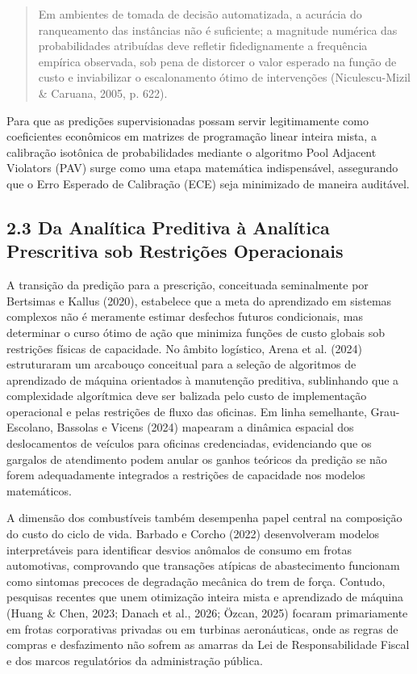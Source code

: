 \documentclass[10pt,a4paper,journal]{article}
\begin{document}
\begin{quote}
\small Em ambientes de tomada de decisão automatizada, a acurácia do ranqueamento das instâncias não é suficiente; a magnitude numérica das probabilidades atribuídas deve refletir fidedignamente a frequência empírica observada, sob pena de distorcer o valor esperado na função de custo e inviabilizar o escalonamento ótimo de intervenções (Niculescu-Mizil \& Caruana, 2005, p. 622).
\end{quote}
Para que as predições supervisionadas possam servir legitimamente como coeficientes econômicos em matrizes de programação linear inteira mista, a calibração isotônica de probabilidades mediante o algoritmo Pool Adjacent Violators (PAV) surge como uma etapa matemática indispensável, assegurando que o Erro Esperado de Calibração (ECE) seja minimizado de maneira auditável.

\subsection{2.3 Da Analítica Preditiva à Analítica Prescritiva sob Restrições Operacionais}
A transição da predição para a prescrição, conceituada seminalmente por Bertsimas e Kallus (2020), estabelece que a meta do aprendizado em sistemas complexos não é meramente estimar desfechos futuros condicionais, mas determinar o curso ótimo de ação que minimiza funções de custo globais sob restrições físicas de capacidade. No âmbito logístico, Arena et al. (2024) estruturaram um arcabouço conceitual para a seleção de algoritmos de aprendizado de máquina orientados à manutenção preditiva, sublinhando que a complexidade algorítmica deve ser balizada pelo custo de implementação operacional e pelas restrições de fluxo das oficinas. Em linha semelhante, Grau-Escolano, Bassolas e Vicens (2024) mapearam a dinâmica espacial dos deslocamentos de veículos para oficinas credenciadas, evidenciando que os gargalos de atendimento podem anular os ganhos teóricos da predição se não forem adequadamente integrados a restrições de capacidade nos modelos matemáticos.

A dimensão dos combustíveis também desempenha papel central na composição do custo do ciclo de vida. Barbado e Corcho (2022) desenvolveram modelos interpretáveis para identificar desvios anômalos de consumo em frotas automotivas, comprovando que transações atípicas de abastecimento funcionam como sintomas precoces de degradação mecânica do trem de força. Contudo, pesquisas recentes que unem otimização inteira mista e aprendizado de máquina (Huang \& Chen, 2023; Danach et al., 2026; Özcan, 2025) focaram primariamente em frotas corporativas privadas ou em turbinas aeronáuticas, onde as regras de compras e desfazimento não sofrem as amarras da Lei de Responsabilidade Fiscal e dos marcos regulatórios da administração pública.
\end{document}
